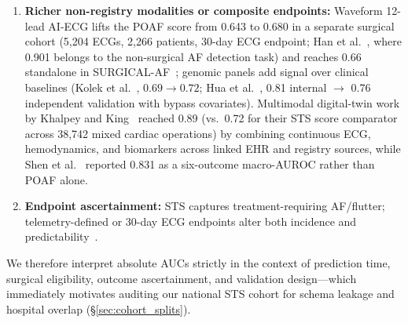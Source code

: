 \begin{enumerate}
  \item \textbf{Richer non-registry modalities or composite endpoints:} Waveform 12-lead AI-ECG lifts the POAF score from 0.643 to 0.680 in a separate surgical cohort (5,204 ECGs, 2,266 patients, 30-day ECG endpoint; Han et al.~\cite{han2025aiecg}, where 0.901 belongs to the non-surgical AF detection task) and reaches 0.66 standalone in SURGICAL-AF~\cite{gruwez2024aiecg}; genomic panels add signal over clinical baselines (Kolek et al.~\cite{kolek2015genetic}, $0.69 \to 0.72$; Hua et al.~\cite{hua2025genomic}, 0.81 internal $\to$ 0.76 independent validation with bypass covariates). Multimodal digital-twin work by Khalpey and King~\cite{khalpey2026digital} reached 0.89 (vs.\ 0.72 for their STS score comparator across 38,742 mixed cardiac operations) by combining continuous ECG, hemodynamics, and biomarkers across linked EHR and registry sources, while Shen et al.~\cite{shen2025surgvae} reported 0.831 as a six-outcome macro-AUROC rather than POAF alone.
  \item \textbf{Endpoint ascertainment:} STS captures treatment-requiring AF/flutter; telemetry-defined or 30-day ECG endpoints alter both incidence and predictability~\cite{filardo2017telemetry,filardo2018onset,filardo2020telemetry,perezgrovas2023jaha}.
\end{enumerate}
We therefore interpret absolute AUCs strictly in the context of prediction time, surgical eligibility, outcome ascertainment, and validation design---which immediately motivates auditing our national STS cohort for schema leakage and hospital overlap (\S\ref{sec:cohort_splits}).
